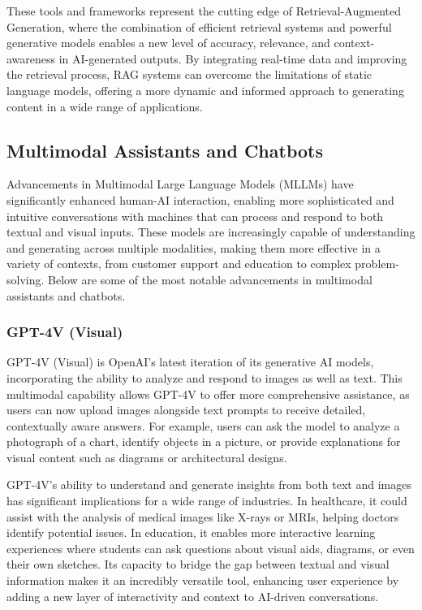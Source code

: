 These tools and frameworks represent the cutting edge of Retrieval-Augmented Generation, where the combination of efficient retrieval systems and powerful generative models enables a new level of accuracy, relevance, and context-awareness in AI-generated outputs. 
By integrating real-time data and improving the retrieval process, RAG systems can overcome the limitations of static language models, offering a more dynamic and informed approach to generating content in a wide range of applications.

\subsection{Multimodal Assistants and Chatbots}

Advancements in Multimodal Large Language Models (MLLMs) have significantly enhanced human-AI interaction, enabling more sophisticated and intuitive conversations with machines that can process and respond to both textual and visual inputs. 
These models are increasingly capable of understanding and generating across multiple modalities, making them more effective in a variety of contexts, from customer support and education to complex problem-solving. 
Below are some of the most notable advancements in multimodal assistants and chatbots.

\subsubsection{GPT-4V (Visual)}

GPT-4V (Visual) is OpenAI's latest iteration of its generative AI models, incorporating the ability to analyze and respond to images as well as text. 
This multimodal capability allows GPT-4V to offer more comprehensive assistance, as users can now upload images alongside text prompts to receive detailed, contextually aware answers. 
For example, users can ask the model to analyze a photograph of a chart, identify objects in a picture, or provide explanations for visual content such as diagrams or architectural designs.

GPT-4V's ability to understand and generate insights from both text and images has significant implications for a wide range of industries. 
In healthcare, it could assist with the analysis of medical images like X-rays or MRIs, helping doctors identify potential issues. 
In education, it enables more interactive learning experiences where students can ask questions about visual aids, diagrams, or even their own sketches. 
Its capacity to bridge the gap between textual and visual information makes it an incredibly versatile tool, enhancing user experience by adding a new layer of interactivity and context to AI-driven conversations.

